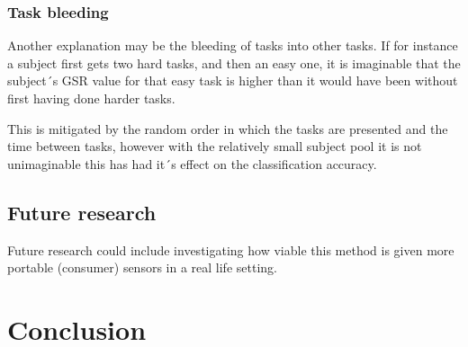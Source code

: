 \documentclass[12pt,fleqn,leqno,letterpaper]{article}
\begin{document}
\subsubsection{Task bleeding}
Another explanation may be the bleeding of tasks into other tasks. If for instance a subject first gets two hard tasks, and then an easy one, it is imaginable that the subject´s GSR value for that easy task is higher than it would have been without first having done harder tasks. 

This is mitigated by the random order in which the tasks are presented and the time between tasks, however with the relatively small subject pool it is not unimaginable this has had it´s effect on the classification accuracy.




\subsection{Future research}
Future research could include investigating how viable this method is given more portable (consumer) sensors in a real life setting. 

\section{Conclusion}





{}

\end{document}

